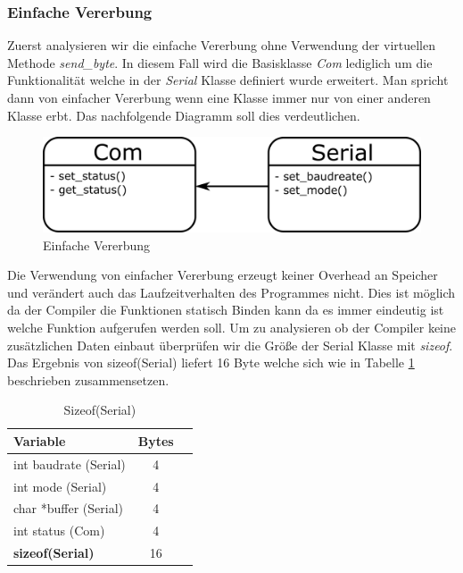 \documentclass[MES,Master,ngerman]{twbook}%
\begin{document}
\newpage
 
\subsubsection{Einfache Vererbung}
Zuerst analysieren wir die einfache Vererbung ohne Verwendung der virtuellen Methode \textit{send\_byte}. In diesem Fall wird die Basisklasse \textit{Com} lediglich um die Funktionalität welche in der \textit{Serial} Klasse definiert wurde erweitert. Man spricht dann von einfacher Vererbung wenn eine Klasse immer nur von einer anderen Klasse erbt. Das nachfolgende Diagramm soll dies verdeutlichen.
\newline

\begin{figure}[h]
	\centering
	\includegraphics[scale=0.65]{../Grafiken/einfache_vererbung.png}
	\caption{Einfache Vererbung}
	\label{fig:32}
\end{figure}

Die Verwendung von einfacher Vererbung erzeugt keiner Overhead an Speicher und verändert auch das Laufzeitverhalten des Programmes nicht. Dies ist möglich da der Compiler die Funktionen statisch Binden kann da es immer eindeutig ist welche Funktion aufgerufen werden soll. Um zu analysieren ob der Compiler keine zusätzlichen Daten einbaut überprüfen wir die Größe der Serial Klasse mit \textit{sizeof}. Das Ergebnis von sizeof(Serial) liefert 16 Byte welche sich wie in Tabelle \ref{tbl:4} beschrieben zusammensetzen.

\begin{table}[!htb]
	\centering
	\begin{tabular}{| l | c | r |}
		\hline
		\textbf{Variable}   & \textbf{Bytes}    \\ \hline
		int baudrate (Serial)        & 4				    \\ \hline
		int mode (Serial)            & 4 	    		\\ \hline
		char *buffer (Serial)       & 4		            \\ \hline
		int status (Com)       & 4  			    \\ \hline
		\textbf{sizeof(Serial)} & 16 \\ \hline

		
	\end{tabular}
	
	\caption{Sizeof(Serial)}
	\label{tbl:4}
\end{table}
\end{document}
